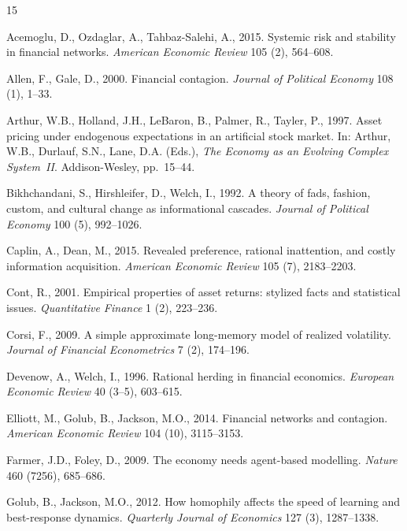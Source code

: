 \documentclass[preprint,12pt,authoryear]{elsarticle}
\begin{document}
\begin{thebibliography}{15}

Acemoglu, D., Ozdaglar, A., Tahbaz-Salehi, A., 2015.
Systemic risk and stability in financial networks.
\textit{American Economic Review} 105 (2), 564--608.

Allen, F., Gale, D., 2000.
Financial contagion.
\textit{Journal of Political Economy} 108 (1), 1--33.

Arthur, W.B., Holland, J.H., LeBaron, B., Palmer, R., Tayler, P., 1997.
Asset pricing under endogenous expectations in an artificial stock market.
In: Arthur, W.B., Durlauf, S.N., Lane, D.A. (Eds.),
\textit{The Economy as an Evolving Complex System~II}.
Addison-Wesley, pp.\ 15--44.

Bikhchandani, S., Hirshleifer, D., Welch, I., 1992.
A theory of fads, fashion, custom, and cultural change as informational
cascades.
\textit{Journal of Political Economy} 100 (5), 992--1026.

Caplin, A., Dean, M., 2015.
Revealed preference, rational inattention, and costly information acquisition.
\textit{American Economic Review} 105 (7), 2183--2203.

Cont, R., 2001.
Empirical properties of asset returns: stylized facts and statistical issues.
\textit{Quantitative Finance} 1 (2), 223--236.

Corsi, F., 2009.
A simple approximate long-memory model of realized volatility.
\textit{Journal of Financial Econometrics} 7 (2), 174--196.

Devenow, A., Welch, I., 1996.
Rational herding in financial economics.
\textit{European Economic Review} 40 (3--5), 603--615.

Elliott, M., Golub, B., Jackson, M.O., 2014.
Financial networks and contagion.
\textit{American Economic Review} 104 (10), 3115--3153.

Farmer, J.D., Foley, D., 2009.
The economy needs agent-based modelling.
\textit{Nature} 460 (7256), 685--686.

Golub, B., Jackson, M.O., 2012.
How homophily affects the speed of learning and best-response dynamics.
\textit{Quarterly Journal of Economics} 127 (3), 1287--1338.


\end{thebibliography}
\end{document}
